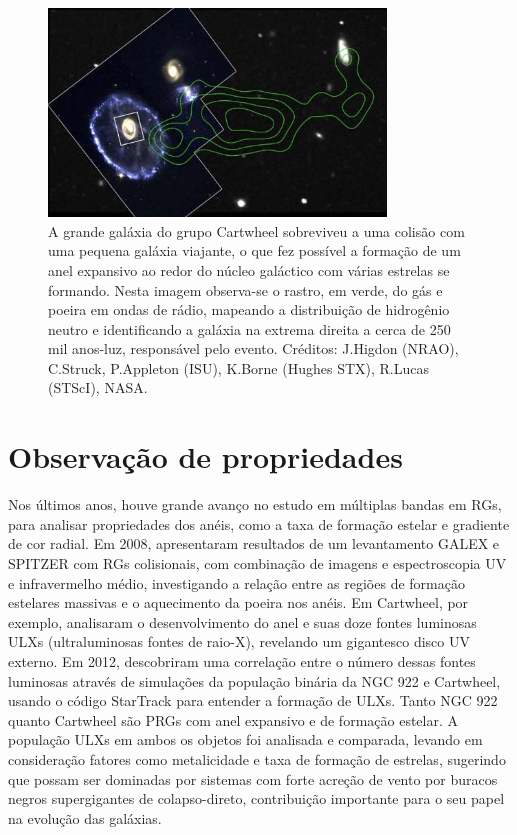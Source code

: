 \begin{figure}[h]
  \centering 
  \includegraphics[width=0.8\textwidth]{Imagens/cartwheel2_hst.jpg} 
  \caption[Galáxia Cartwheel e sua interagente.]{A grande galáxia do grupo Cartwheel sobreviveu a uma colisão com uma pequena galáxia viajante, o que fez possível a formação de um anel expansivo ao redor do núcleo galáctico com várias estrelas se formando. Nesta imagem observa-se o rastro, em verde, do gás e poeira em ondas de rádio, mapeando a distribuição de hidrogênio neutro e identificando a galáxia na extrema direita a cerca de 250 mil anos-luz, responsável pelo evento. Créditos: J.Higdon (NRAO), C.Struck, P.Appleton (ISU), K.Borne (Hughes STX), R.Lucas (STScI), NASA.}
  \label{fig:g3} 
\end{figure}

\section{Observação de propriedades}

Nos últimos anos, houve grande avanço no estudo em múltiplas bandas em RGs, para analisar propriedades dos anéis, como a taxa de formação estelar e gradiente de cor radial. Em 2008,  apresentaram resultados de um levantamento GALEX e SPITZER com RGs colisionais, com combinação de imagens e espectroscopia UV e infravermelho médio, investigando a relação entre as regiões de formação estelares massivas e o aquecimento da poeira nos anéis. Em Cartwheel, por exemplo, analisaram o desenvolvimento do anel e suas doze fontes luminosas ULXs (ultraluminosas fontes de raio-X), revelando um gigantesco disco UV externo. Em 2012,  descobriram uma correlação entre o número dessas fontes luminosas através de simulações da população binária da NGC 922 e Cartwheel, usando o código StarTrack para entender a formação de ULXs. Tanto NGC 922 quanto Cartwheel são PRGs com anel expansivo e de formação estelar. A população ULXs em ambos os objetos foi analisada e comparada, levando em consideração fatores como metalicidade e taxa de formação de estrelas, sugerindo que possam ser dominadas por sistemas com forte acreção de vento por buracos negros supergigantes de colapso-direto, contribuição importante para o seu papel na evolução das galáxias. 

